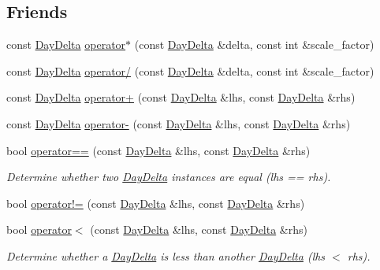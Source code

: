 \subsection*{Friends}
\begin{DoxyCompactItemize}
\item 
const \hyperlink{structDayDelta}{Day\-Delta} \hyperlink{structDayDelta_af888d4911eda6f27731cbf92bb393c32}{operator$\ast$} (const \hyperlink{structDayDelta}{Day\-Delta} \&delta, const int \&scale\-\_\-factor)
\item 
const \hyperlink{structDayDelta}{Day\-Delta} \hyperlink{structDayDelta_a9469df031e6aba7593890989a954ae35}{operator/} (const \hyperlink{structDayDelta}{Day\-Delta} \&delta, const int \&scale\-\_\-factor)
\item 
const \hyperlink{structDayDelta}{Day\-Delta} \hyperlink{structDayDelta_a371e4babc2d194244a5b4cea3ea66d7e}{operator+} (const \hyperlink{structDayDelta}{Day\-Delta} \&lhs, const \hyperlink{structDayDelta}{Day\-Delta} \&rhs)
\item 
const \hyperlink{structDayDelta}{Day\-Delta} \hyperlink{structDayDelta_a1b59f350f113499fac66fe2f180fca7a}{operator-\/} (const \hyperlink{structDayDelta}{Day\-Delta} \&lhs, const \hyperlink{structDayDelta}{Day\-Delta} \&rhs)
\item 
bool \hyperlink{structDayDelta_a04f6712422789b8ec3f19d3e1789bf4f}{operator==} (const \hyperlink{structDayDelta}{Day\-Delta} \&lhs, const \hyperlink{structDayDelta}{Day\-Delta} \&rhs)
\begin{DoxyCompactList}\small\item\em Determine whether two \hyperlink{structDayDelta}{Day\-Delta} instances are equal (lhs == rhs). \end{DoxyCompactList}\item 
bool \hyperlink{structDayDelta_ad0581c91724489d68bd79382831a5a1e}{operator!=} (const \hyperlink{structDayDelta}{Day\-Delta} \&lhs, const \hyperlink{structDayDelta}{Day\-Delta} \&rhs)
\item 
bool \hyperlink{structDayDelta_ad6792531d3979ec77fd7ddce40a1a496}{operator$<$} (const \hyperlink{structDayDelta}{Day\-Delta} \&lhs, const \hyperlink{structDayDelta}{Day\-Delta} \&rhs)
\begin{DoxyCompactList}\small\item\em Determine whether a \hyperlink{structDayDelta}{Day\-Delta} is less than another \hyperlink{structDayDelta}{Day\-Delta} (lhs $<$ rhs). \end{DoxyCompactList}\item 

\end{DoxyCompactItemize}
